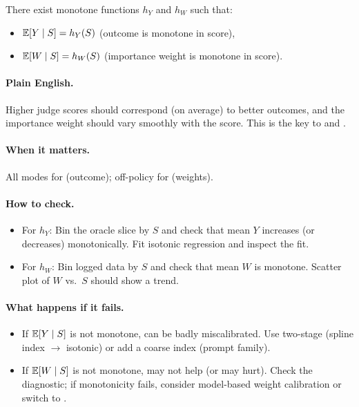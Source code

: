\begin{assumption}
\label{assum:j2m}
There exist monotone functions $h_Y$ and $h_W$ such that:
\begin{itemize}
\item $\operatorname{\mathbb{E}}[Y \mid S] = h_Y(S)$ (outcome is monotone in score),
\item $\operatorname{\mathbb{E}}[W \mid S] = h_W(S)$ (importance weight is monotone in score).
\end{itemize}
\end{assumption}

\paragraph{Plain English.} Higher judge scores should correspond (on average) to better outcomes, and the importance weight should vary smoothly with the score. This is the key to \autocal{} and \simcal.

\paragraph{When it matters.} All modes for \autocal{} (outcome); off-policy for \simcal{} (weights).

\paragraph{How to check.} 
\begin{itemize}
\item For $h_Y$: Bin the oracle slice by $S$ and check that mean $Y$ increases (or decreases) monotonically. Fit isotonic regression and inspect the fit.
\item For $h_W$: Bin logged data by $S$ and check that mean $W$ is monotone. Scatter plot of $W$ vs.\ $S$ should show a trend.
\end{itemize}

\paragraph{What happens if it fails.} 
\begin{itemize}
\item If $\operatorname{\mathbb{E}}[Y \mid S]$ is not monotone, \autocal{} can be badly miscalibrated. Use two-stage \autocal{} (spline index $\to$ isotonic) or add a coarse index (prompt family).
\item If $\operatorname{\mathbb{E}}[W \mid S]$ is not monotone, \simcal{} may not help (or may hurt). Check the diagnostic; if monotonicity fails, consider model-based weight calibration or switch to \dr.
\end{itemize}

